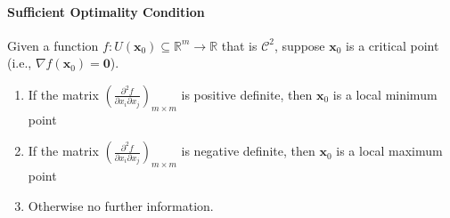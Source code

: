 \paragraph{Sufficient Optimality Condition}


\begin{theorem}
Given a function $f:U(\bm x_0)\subseteq\mathbb{R}^m\to\mathbb{R}$ that is $\mathcal{C}^2$, suppose $\bm x_0$ is a critical point (i.e., $\nabla f(\bm x_0)=\bm0$).
\begin{enumerate}
\item
If the matrix $(\frac{\partial^2f}{\partial x_i\partial x_j})_{m\times m}$ is positive definite, then $\bm x_0$ is a local minimum point
\item
If the matrix $(\frac{\partial^2f}{\partial x_i\partial x_j})_{m\times m}$ is negative definite, then $\bm x_0$ is a local maximum point
\item
Otherwise no further information.
\end{enumerate}
\end{theorem}
